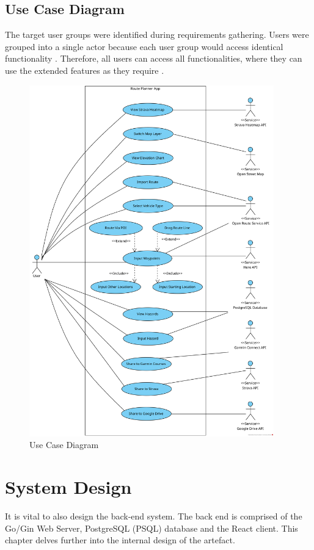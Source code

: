 \subsection{Use Case Diagram}
\label{usecase:diagram}
The target user groups were identified during requirements gathering. Users were grouped into a single actor because each user group would access identical functionality . Therefore, all users can access all functionalities, where they can use the extended features as they require .

\begin{figure}[!ht]
  \centering
  \includegraphics[width=400px]{figures/use-case.png}
  \caption{Use Case Diagram}
  \label{fig:usecase}
\end{figure}

\section{System Design}
\label{design:system}

It is vital to also design the back-end system. The back end is comprised of the Go/Gin Web Server, PostgreSQL (PSQL) database and the React client. This chapter delves further into the internal design of the artefact. 

